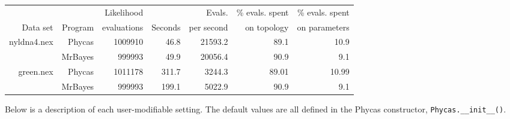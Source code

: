 \documentclass[10pt]{article}
\begin{document}
\begin{tabular}{rrrrrrr}
            &         & Likelihood  &            & Evals.      & \% evals. spent & \% evals. spent \\
Data set    & Program & evaluations &  Seconds   & per second  & on topology     & on parameters \\ \hline
nyldna4.nex & Phycas  &  1009910    &   46.8     & 21593.2     &   89.1 & 10.9 \\
            & MrBayes &   999993    &   49.9     & 20056.4     &   90.9 &  9.1 \\ \hline
green.nex   & Phycas  &  1011178    &  311.7     & 3244.3      &   89.01 & 10.99 \\
            & MrBayes &   999993    &  199.1     & 5022.9      &   90.9 &  9.1 \\ \hline
\end{tabular}

Below is a description of each user-modifiable setting. The default values are all defined in the Phycas constructor, \verb+Phycas.__init__()+.

\end{document}
